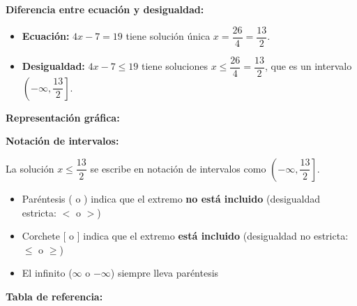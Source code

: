 \begin{example}
\textbf{Diferencia entre ecuación y desigualdad:}

\begin{itemize}
    \item \textbf{Ecuación:} $4x - 7 = 19$ tiene solución única $x = \dfrac{26}{4} = \dfrac{13}{2}$.

    \item \textbf{Desigualdad:} $4x - 7 \le 19$ tiene soluciones $x \le \dfrac{26}{4} = \dfrac{13}{2}$, que es un intervalo $\left(-\infty, \dfrac{13}{2}\right]$.
\end{itemize}

\textbf{Representación gráfica:}

\begin{center}
\end{center}

\vspace{0.3cm}
\textbf{Notación de intervalos:}

La solución $x \le \dfrac{13}{2}$ se escribe en notación de intervalos como $\left(-\infty, \dfrac{13}{2}\right]$.

\begin{itemize}
    \item Paréntesis ( o ) indica que el extremo \textbf{no está incluido} (desigualdad estricta: $<$ o $>$)
    \item Corchete [ o ] indica que el extremo \textbf{está incluido} (desigualdad no estricta: $\le$ o $\ge$)
    \item El infinito ($\infty$ o $-\infty$) siempre lleva paréntesis
\end{itemize}

\textbf{Tabla de referencia:}


\end{example}
